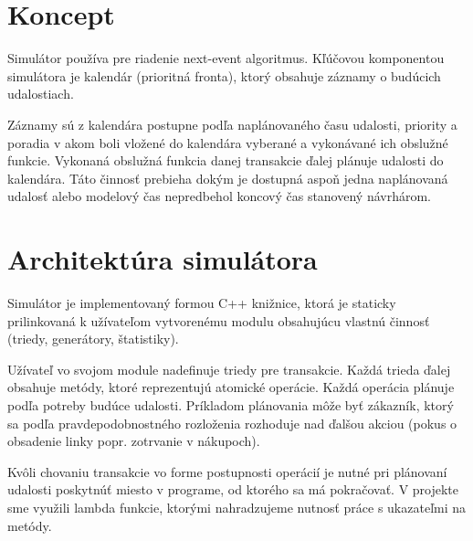 \documentclass[11pt, a4paper, titlepage]{article}
\begin{document}
\section{Koncept}
Simulátor používa pre riadenie next-event algoritmus\cite[str.~39]{opora}. Kľúčovou komponentou simulátora je kalendár (prioritná fronta)\cite[str.34]{opora}, ktorý obsahuje záznamy o budúcich udalostiach.

Záznamy sú z kalendára postupne podľa naplánovaného času udalosti, priority a poradia v akom boli vložené do kalendára vyberané a vykonávané ich obslužné funkcie. Vykonaná obslužná funkcia danej transakcie ďalej plánuje udalosti do kalendára. Táto činnosť prebieha dokým je dostupná aspoň jedna naplánovaná udalosť alebo modelový čas\cite[str.~41]{opora} nepredbehol koncový čas stanovený návrhárom.


\section{Architektúra simulátora}
Simulátor je implementovaný formou C++ knižnice, ktorá je staticky prilinkovaná k užívateľom vytvorenému modulu obsahujúcu vlastnú činnosť (triedy, generátory, štatistiky).

Užívateľ vo svojom module nadefinuje triedy pre transakcie. Každá trieda ďalej obsahuje metódy, ktoré reprezentujú atomické operácie. Každá operácia plánuje podľa potreby budúce udalosti. Príkladom plánovania môže byť zákazník, ktorý sa podľa pravdepodobnostného rozloženia rozhoduje nad ďalšou akciou (pokus o obsadenie linky popr. zotrvanie v nákupoch).

Kvôli chovaniu transakcie vo forme postupnosti operácií je nutné pri plánovaní udalosti poskytnúť miesto v programe, od ktorého sa má pokračovať. V projekte sme využili lambda funkcie\cite{lambda}, ktorými nahradzujeme nutnosť práce s ukazateľmi na metódy.

%
\end{document}
